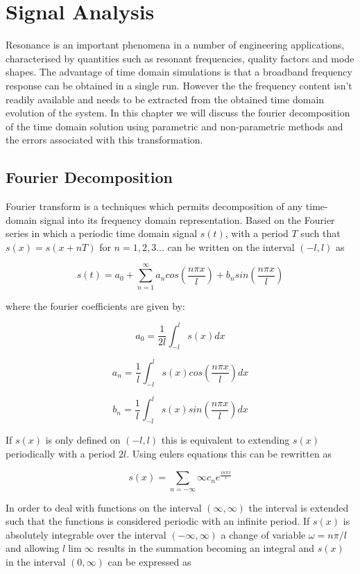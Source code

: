 \chapter{Signal Analysis}
\label{Ch:SignalAnalysis}

Resonance is an important phenomena in a number of engineering applications, characterised by quantities such as resonant frequencies, quality factors and mode shapes. The advantage of time domain simulations is that a broadband frequency response can be obtained in a single run. However the the frequency content isn't readily available and needs to be extracted from the obtained time domain evolution of the system. In this chapter we will discuss the fourier decomposition of the time domain solution using parametric and non-parametric methods and the errors associated with this transformation.

\section{Fourier Decomposition}

Fourier transform is a techniques which permits decomposition of any time-domain signal into its frequency domain representation. Based on the Fourier series in which a periodic time domain signal $s(t)$, with a period $T$ such that $s(x)=s(x+nT)$ for $n=1,2,3 ...$ can be written on the interval $(-l,l)$ as

$$
s(t) = a_0 + \sum_{n=1}^{\infty} a_n cos(\frac{n\pi x}{l}) + b_n sin(\frac{n\pi x}{l})
$$

where the fourier coefficients are given by:

$$
a_0 = \frac{1}{2l}\int_{-l}^{l} s(x) dx
$$

$$
a_n = \frac{1}{l}\int_{-l}^{l} s(x) cos(\frac{n \pi x}{l}) dx
$$

$$
b_n = \frac{1}{l}\int_{-l}^{l} s(x) sin(\frac{n \pi x}{l}) dx
$$

If $s(x)$ is only defined on $(-l,l)$ this is equivalent to extending $s(x)$ periodically with a period $2l$. Using eulers equations this can be rewritten as

$$
s(x) = \sum_{n=-\infty}{\infty} c_n e^{\frac{i n \pi x}{l}}
$$

In order to deal with functions on the interval $(\infty,\infty)$ the interval is extended such that the functions is considered periodic with an infinite period. If $s(x)$ is absolutely integrable over the interval $(-\infty,\infty)$ a change of variable $\omega = n \pi / l$ and allowing $l \lim \infty$ results in the summation becoming an integral and $s(x)$ in the interval $(0,\infty)$ can be expressed as

